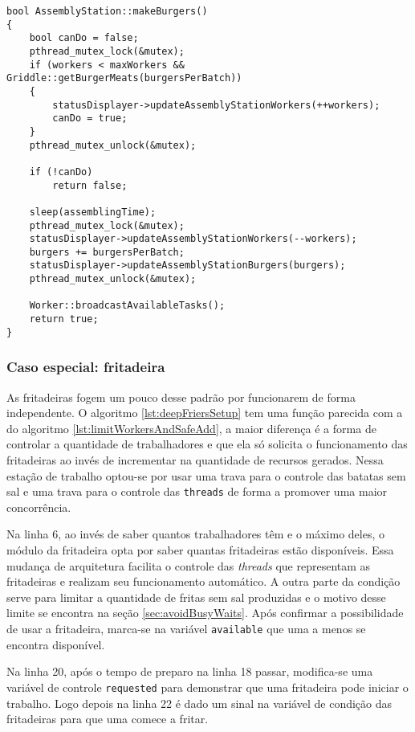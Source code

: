 \documentclass[a4paper]{article}
\begin{document}
\begin{lstlisting}[caption=Limitação de funcionários e adição segura de recursos na estação de montagem de hambúrgueres.\label{lst:limitWorkersAndSafeAdd}]
bool AssemblyStation::makeBurgers()
{
	bool canDo = false;
	pthread_mutex_lock(&mutex);
	if (workers < maxWorkers && Griddle::getBurgerMeats(burgersPerBatch))
	{
		statusDisplayer->updateAssemblyStationWorkers(++workers);
		canDo = true;
	}
	pthread_mutex_unlock(&mutex);
	
	if (!canDo)
		return false;
	
	sleep(assemblingTime);
	pthread_mutex_lock(&mutex);
	statusDisplayer->updateAssemblyStationWorkers(--workers);
	burgers += burgersPerBatch;
	statusDisplayer->updateAssemblyStationBurgers(burgers);
	pthread_mutex_unlock(&mutex);
	
	Worker::broadcastAvailableTasks();
	return true;
}
\end{lstlisting}

\subsubsection{Caso especial: fritadeira}
\label{sec:specialCaseDeepFriers}

As fritadeiras fogem um pouco desse padrão por funcionarem de forma independente. O algoritmo \ref{lst:deepFriersSetup} tem uma função parecida com a do algoritmo \ref{lst:limitWorkersAndSafeAdd}, a maior diferença é a forma de controlar a quantidade de trabalhadores e que ela só solicita o funcionamento das fritadeiras ao invés de incrementar na quantidade de recursos gerados. Nessa estação de trabalho optou-se por usar uma trava para o controle das batatas sem sal e uma trava para o controle das \texttt{threads} de forma a promover uma maior concorrência.

Na linha 6, ao invés de saber quantos trabalhadores têm e o máximo deles, o módulo da fritadeira opta por saber quantas fritadeiras estão disponíveis. Essa mudança de arquitetura facilita o controle das \textit{threads} que representam as fritadeiras e realizam seu funcionamento automático. A outra parte da condição serve para limitar a quantidade de fritas sem sal produzidas e o motivo desse limite se encontra na seção \ref{sec:avoidBusyWaits}. Após confirmar a possibilidade de usar a fritadeira, marca-se na variável \texttt{available} que uma a menos se encontra disponível. 

Na linha 20, após o tempo de preparo na linha 18 passar, modifica-se uma variável de controle \texttt{requested} para demonstrar que uma fritadeira pode iniciar o trabalho. Logo depois na linha 22 é dado um sinal na variável de condição das fritadeiras para que uma comece a fritar.
\end{document}
